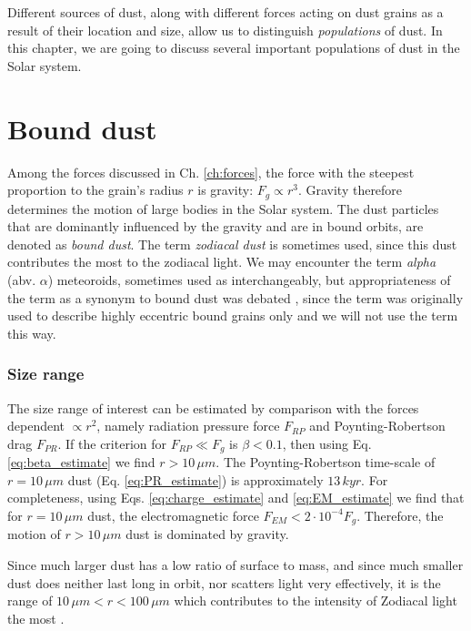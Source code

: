 Different sources of dust, along with different forces acting on dust grains as a result of their location and size, allow us to distinguish \textit{populations} of dust. In this chapter, we are going to discuss several important populations of dust in the Solar system.

\section{Bound dust}

Among the forces discussed in Ch. \ref{ch:forces}, the force with the steepest proportion to the grain's radius $r$ is gravity: $F_g \propto r^3$. Gravity therefore determines the motion of large bodies in the Solar system. The dust particles that are dominantly influenced by the gravity and are in bound orbits, are denoted as \textit{bound dust}. The term \textit{zodiacal dust} is sometimes used, since this dust contributes the most to the zodiacal light. We may encounter the term \textit{alpha} (abv. $\alpha$) meteoroids, sometimes used as interchangeably, but appropriateness of the term as a synonym to bound dust was debated \citep{sommer2023alpha}, since the term was originally used to describe highly eccentric bound grains only \citep{zook1975source} and we will not use the term this way.

\subsubsection{Size range}

The size range of interest can be estimated by comparison with the forces dependent $\propto r^2$, namely radiation pressure force $F_{RP}$ and Poynting-Robertson drag $F_{PR}$. If the criterion for $F_{RP} \ll F_g$ is $\beta<0.1$, then using Eq. \ref{eq:beta_estimate} we find $r>10 \, \si{\mu m}$. The Poynting-Robertson time-scale of $r=10 \, \si{\mu m}$ dust (Eq. \ref{eq:PR_estimate}) is approximately $13 \, \si{kyr}$. For completeness, using Eqs. \ref{eq:charge_estimate} and \ref{eq:EM_estimate} we find that for $r=10 \, \si{\mu m}$ dust, the electromagnetic force $F_{EM} < 2\cdot 10^{-4} F_g$. Therefore, the motion of $r>10 \, \si{\mu m}$ dust is dominated by gravity.

Since much larger dust has a low ratio of surface to mass, and since much smaller dust does neither last long in orbit, nor scatters light very effectively, it is the range of $10 \, \si{\mu m} < r < 100 \, \si{\mu m}$ which contributes to the intensity of Zodiacal light the most \citep{leinert1981zodiacal}. 

